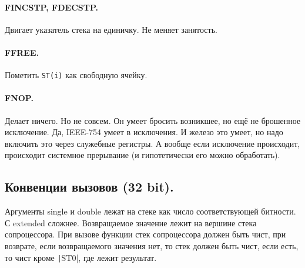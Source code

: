 \documentclass{article}
\begin{document}
    \paragraph{FINCSTP, FDECSTP.}
    Двигает указатель стека на единичку. Не меняет занятость.
    \paragraph{FFREE.}
    Пометить \Verb|ST(i)| как свободную ячейку.
    \paragraph{FNOP.}
    Делает ничего. Но не совсем. Он умеет бросить возникшее, но ещё не брошенное исключение. Да, IEEE-754 умеет в исключения. И железо это умеет, но надо включить это через служебные регистры. А вообще если исключение происходит, происходит системное прерывание (и гипотетически его можно обработать).
    \subsection{Конвенции вызовов (32 bit).}
    Аргументы single и double лежат на стеке как число соответствующей битности. С extended сложнее. Возвращаемое значение лежит на вершине стека сопроцессора. При вызове функции стек сопроцессора должен быть чист, при возврате, если возвращаемого значения нет, то стек должен быть чист, если есть, то чист кроме \texttt|ST0|, где лежит результат.
\end{document}
